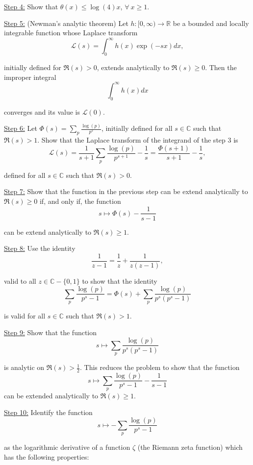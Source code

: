\documentclass[11pt]{amsart}
\numberwithin{equation}{section}
\newcommand{\R}{\mathbb{R}}
\newcommand{\C}{\mathbb{C}}
\newcommand{\disum}{\displaystyle \sum}
\newcommand{\diint}{\displaystyle \int}
\newcommand{\difrac}{\displaystyle \frac}
\begin{document}
\noindent \underline{Step 4:} Show that $\theta(x) \leq \log(4)x$, $\forall \ x \geq 1$.

\noindent \underline{Step 5:} (Newman's analytic theorem) Let $h: [0, \infty) \to \R$ be a bounded and locally integrable function whose Laplace transform $$\mathscr{L}(s) = \diint_{0}^{\infty} h(x)\exp(-sx) dx,$$

\noindent initially defined for $\Re(s) > 0$, extends analytically to $\Re(s) \geq 0$. Then the improper integral $$\diint_{0}^{\infty} h(x) dx$$

\noindent converges and its value is $\mathscr{L}(0)$.

\noindent \underline{Step 6:} Let $\Phi(s) = \disum_p \difrac{\log(p)}{p^s}$, initially defined for all $s \in \C$ such that $\Re(s) > 1$. Show that the Laplace transform of the integrand of the step $3$ is $$\mathscr{L}(s) = \difrac{1}{s+1} \sum_p \difrac{\log(p)}{p^{s + 1}} - \difrac{1}{s} = \difrac{\Phi(s + 1)}{s + 1} - \difrac{1}{s},$$

\noindent defined for all $s \in \C$ such that $\Re(s) > 0$.

\noindent \underline{Step 7:} Show that the function in the previous step can be extend analytically to $\Re(s) \geq 0$ if, and only if, the function $$s \mapsto \Phi(s) - \difrac{1}{s - 1}$$

\noindent can be extend analytically to $\Re(s) \geq 1$.

\noindent \underline{Step 8:} Use the identity $$\difrac{1}{z - 1} = \difrac{1}{z} + \difrac{1}{z(z - 1)},$$

\noindent valid to all $z \in \C - \{0, 1\}$ to show that the identity $$\sum_p \difrac{\log(p)}{p^s - 1} = \Phi(s) + \sum_p \difrac{\log(p)}{p^s(p^s - 1)}$$

\noindent is valid for all $s \in \C$ such that $\Re(s) > 1$.

\noindent \underline{Step 9:} Show that the function $$s \mapsto \sum_p \difrac{\log(p)}{p^s(p^s - 1)}$$

\noindent is analytic on $\Re(s) > \difrac{1}{2}$. This reduces the problem to show that the function $$s \mapsto \sum_p \difrac{\log(p)}{p^s - 1} - \difrac{1}{s - 1}$$ can be extended analytically to $\Re(s) \geq 1$.

\noindent \underline{Step 10:} Identify the function $$s \mapsto -\sum_p \difrac{\log(p)}{p^s - 1}$$

\noindent as the logarithmic derivative of a function $\zeta$ (the Riemann zeta function) which has the following properties:
\end{document}
